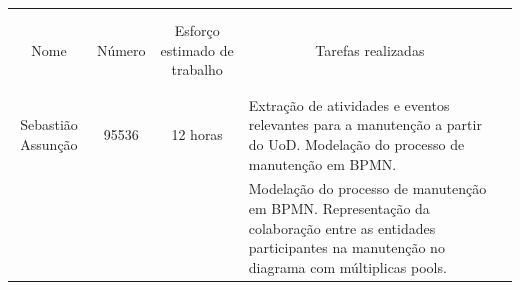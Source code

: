 \documentclass{article}
\begin{document}
    \begin{table}[H]
        \centering
        \begin{tabular}{|l|l|l|l|l}
        \cline{1-4}
        \multicolumn{1}{|l|}{}                   & \multicolumn{1}{l|}{}       & \multicolumn{1}{l|}{}                             & \multicolumn{1}{l|}{}                   &  \\
        \multicolumn{1}{|l|}{}                   & \multicolumn{1}{l|}{}       & \multicolumn{1}{l|}{}                             & \multicolumn{1}{l|}{}                   &  \\
        \multicolumn{1}{|c|}{Nome}               & \multicolumn{1}{c|}{Número} & \multicolumn{1}{c|}{Esforço estimado de trabalho} & \multicolumn{1}{c|}{Tarefas realizadas} &  \\
        \multicolumn{1}{|l|}{}                   & \multicolumn{1}{l|}{}       & \multicolumn{1}{l|}{}                             & \multicolumn{1}{l|}{}                   &  \\
        \multicolumn{1}{|l|}{}                   & \multicolumn{1}{l|}{}       & \multicolumn{1}{l|}{}                             & \multicolumn{1}{l|}{}                   &  \\ \cline{1-4}
        \multicolumn{1}{|l|}{}                   & \multicolumn{1}{l|}{}       & \multicolumn{1}{l|}{}                             & \multirow{5}{7cm}{Extração de atividades e eventos relevantes para a manutenção a partir do UoD. Modelação do processo de manutenção em BPMN.}                   &   \\
        \multicolumn{1}{|l|}{}                   & \multicolumn{1}{l|}{}       & \multicolumn{1}{l|}{}                             & \multicolumn{1}{l|}{}                   &  \\
        \multicolumn{1}{|c|}{Sebastião Assunção} & \multicolumn{1}{c|}{95536}  & \multicolumn{1}{c|}{12 horas}                     & \multicolumn{1}{l|}{}                   &  \\
        \multicolumn{1}{|l|}{}                   & \multicolumn{1}{l|}{}       & \multicolumn{1}{l|}{}                             & \multicolumn{1}{l|}{}                   &  \\
        \multicolumn{1}{|l|}{}                   & \multicolumn{1}{l|}{}       & \multicolumn{1}{l|}{}                             & \multicolumn{1}{l|}{}                   &  \\ \cline{1-4}
        \multicolumn{1}{|l|}{}                   & \multicolumn{1}{l|}{}       & \multicolumn{1}{l|}{}                             & \multirow{5}{7cm}{Modelação do processo de manutenção em BPMN. Representação da colaboração entre as entidades participantes na manutenção no diagrama com múltiplicas pools.}                   &  \\

\end{tabular}
\end{table}
\end{document}
